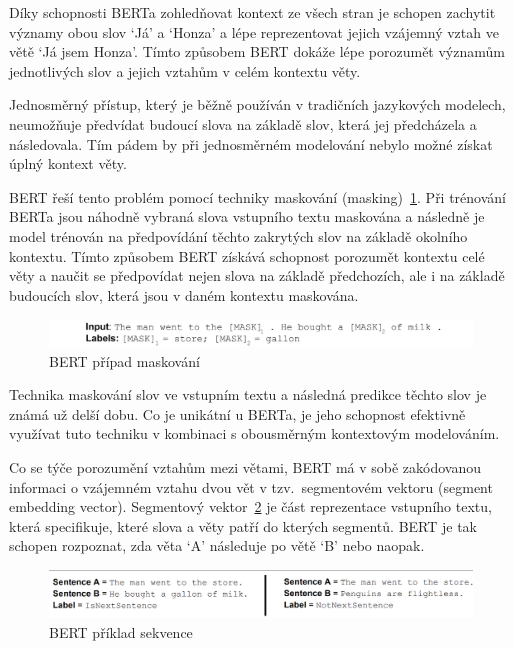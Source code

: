 Díky schopnosti BERTa zohledňovat kontext ze všech stran je schopen zachytit významy obou slov `Já' a `Honza' a lépe reprezentovat jejich vzájemný vztah ve větě `Já jsem Honza'.
Tímto způsobem BERT dokáže lépe porozumět významům jednotlivých slov a jejich vztahům v celém kontextu věty.

Jednosměrný přístup, který je běžně používán v tradičních jazykových modelech, neumožňuje předvídat budoucí slova na základě slov, která jej předcházela a následovala.
Tím pádem by při jednosměrném modelování nebylo možné získat úplný kontext věty.

BERT řeší tento problém pomocí techniky maskování (masking)~\ref{fig:BERT maskovani}.
Při trénování BERTa jsou náhodně vybraná slova vstupního textu maskována a následně je model trénován na předpovídání těchto zakrytých slov na základě okolního kontextu.
Tímto způsobem BERT získává schopnost porozumět kontextu celé věty a naučit se předpovídat nejen slova na základě předchozích, ale i na základě budoucích slov, která jsou v daném kontextu maskována.

\begin{figure}[H]
	\centering
	\includegraphics[width=1\textwidth]{Figures/BERT_bi.png}
	\caption{BERT případ maskování~\cite{link24}}\label{fig:BERT maskovani}
\end{figure}

Technika maskování slov ve vstupním textu a následná predikce těchto slov je známá už delší dobu.
Co je unikátní u BERTa, je jeho schopnost efektivně využívat tuto techniku v kombinaci s obousměrným kontextovým modelováním.

Co se týče porozumění vztahům mezi větami, BERT má v sobě zakódovanou informaci o vzájemném vztahu dvou vět v tzv.\ segmentovém vektoru (segment embedding vector).
Segmentový vektor~\ref{fig:BERT priklad sekvence} je část reprezentace vstupního textu, která specifikuje, které slova a věty patří do kterých segmentů.
BERT je tak schopen rozpoznat, zda věta `A' následuje po větě `B' nebo naopak.

\begin{figure}[H]
	\centering
	\includegraphics[width=1\textwidth]{Figures/BERT_sequence.png}
	\caption{BERT příklad sekvence~\cite{link24}}\label{fig:BERT priklad sekvence}
\end{figure}

